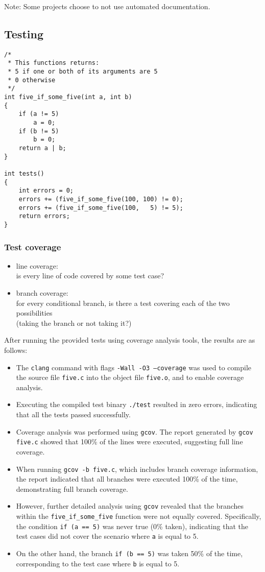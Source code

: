 \documentclass[12pt]{article}
\begin{document}
Note: Some projects choose to not use automated documentation.

\subsection{Testing}
\begin{verbatim}
/*
 * This functions returns:
 * 5 if one or both of its arguments are 5
 * 0 otherwise
 */
int five_if_some_five(int a, int b)
{
    if (a != 5)
        a = 0;
    if (b != 5)
        b = 0;
    return a | b;
}

int tests()
{
    int errors = 0;
    errors += (five_if_some_five(100, 100) != 0);
    errors += (five_if_some_five(100,   5) != 5);
    return errors;
}
\end{verbatim}

\subsubsection{Test coverage}
\begin{itemize}
    \item line coverage: \\
    is every line of code covered by some test case?
    \item branch coverage: \\
    for every conditional branch, is there a test covering each of the two possibilities \\
    (taking the branch or not taking it?)
\end{itemize}

After running the provided tests using coverage analysis tools, the results are as follows:

\begin{itemize}
    \item The \texttt{clang} command with flags \texttt{-Wall -O3 --coverage} was used to compile the source file \texttt{five.c} into the object file \texttt{five.o}, and to enable coverage analysis.
    \item Executing the compiled test binary \texttt{./test} resulted in zero errors, indicating that all the tests passed successfully.
    \item Coverage analysis was performed using \texttt{gcov}. The report generated by \texttt{gcov five.c} showed that 100\% of the lines were executed, suggesting full line coverage.
    \item When running \texttt{gcov -b five.c}, which includes branch coverage information, the report indicated that all branches were executed 100\% of the time, demonstrating full branch coverage.
    \item However, further detailed analysis using \texttt{gcov} revealed that the branches within the \texttt{five\_if\_some\_five} function were not equally covered. Specifically, the condition \texttt{if (a == 5)} was never true (0\% taken), indicating that the test cases did not cover the scenario where \texttt{a} is equal to 5.
    \item On the other hand, the branch \texttt{if (b == 5)} was taken 50\% of the time, corresponding to the test case where \texttt{b} is equal to 5.
\end{itemize}
\end{document}
